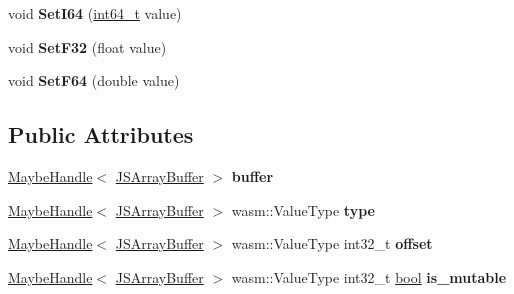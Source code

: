 \begin{DoxyCompactItemize}
\item 
\mbox{\label{classv8_1_1internal_1_1WasmGlobalObject_a1486e24b7ddd3d261621fa9ccd67cc38}} 
void {\bfseries Set\+I64} (\mbox{\hyperlink{classint64__t}{int64\+\_\+t}} value)
\item 
\mbox{\label{classv8_1_1internal_1_1WasmGlobalObject_af4c70e0c0f0ecbebfcf09a62c508c0fe}} 
void {\bfseries Set\+F32} (float value)
\item 
\mbox{\label{classv8_1_1internal_1_1WasmGlobalObject_a03e439b424fb7450ed9903c0b648fcac}} 
void {\bfseries Set\+F64} (double value)
\end{DoxyCompactItemize}
\subsection*{Public Attributes}
\begin{DoxyCompactItemize}
\item 
\mbox{\label{classv8_1_1internal_1_1WasmGlobalObject_a5bb99781f256fc2800560f6981041738}} 
\mbox{\hyperlink{classv8_1_1internal_1_1MaybeHandle}{Maybe\+Handle}}$<$ \mbox{\hyperlink{classv8_1_1internal_1_1JSArrayBuffer}{J\+S\+Array\+Buffer}} $>$ {\bfseries buffer}
\item 
\mbox{\label{classv8_1_1internal_1_1WasmGlobalObject_a24feb29de9bdcabb88f6ea1962bdef48}} 
\mbox{\hyperlink{classv8_1_1internal_1_1MaybeHandle}{Maybe\+Handle}}$<$ \mbox{\hyperlink{classv8_1_1internal_1_1JSArrayBuffer}{J\+S\+Array\+Buffer}} $>$ wasm\+::\+Value\+Type {\bfseries type}
\item 
\mbox{\label{classv8_1_1internal_1_1WasmGlobalObject_ad5cedffc8473f08847212ae1a43150d9}} 
\mbox{\hyperlink{classv8_1_1internal_1_1MaybeHandle}{Maybe\+Handle}}$<$ \mbox{\hyperlink{classv8_1_1internal_1_1JSArrayBuffer}{J\+S\+Array\+Buffer}} $>$ wasm\+::\+Value\+Type int32\+\_\+t {\bfseries offset}
\item 
\mbox{\label{classv8_1_1internal_1_1WasmGlobalObject_a857cfbab0349321bc58545f81eb97a64}} 
\mbox{\hyperlink{classv8_1_1internal_1_1MaybeHandle}{Maybe\+Handle}}$<$ \mbox{\hyperlink{classv8_1_1internal_1_1JSArrayBuffer}{J\+S\+Array\+Buffer}} $>$ wasm\+::\+Value\+Type int32\+\_\+t \mbox{\hyperlink{classbool}{bool}} {\bfseries is\+\_\+mutable}
\end{DoxyCompactItemize}

